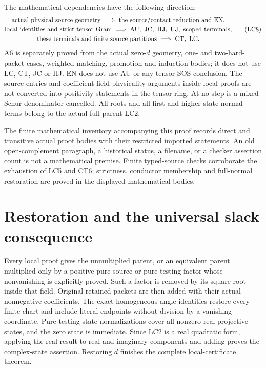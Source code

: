 The mathematical dependencies have the following direction:
\[
\begin{gathered}
 \text{actual physical source geometry}
       \ \Longrightarrow\ \text{the source/contact reduction and EN},\\
 \text{local identities and strict tensor Gram}
       \ \Longrightarrow\ {\rm AU,\ JC,\ HJ,\ UJ},
       \ \text{scoped terminals},\\
 \text{these terminals and finite source partitions}
       \ \Longrightarrow\ {\rm CT,\ LC}.
\end{gathered}\tag{LC8}
\]
A6 is separately proved from the actual zero-\(d\) geometry,
one- and two-hard-packet cases, weighted matching, promotion
and induction bodies; it does not use LC, CT, JC or HJ.
EN does not use AU or any tensor-SOS conclusion.
The source entries and coefficient-field physicality arguments
inside local proofs are not converted into positivity
statements in the tensor ring.
At no step is a mixed Schur denominator cancelled.
All roots and all first and higher state-normal terms belong
to the actual full parent LC2.

The finite mathematical inventory accompanying this proof
records direct and transitive actual proof bodies with their
restricted imported statements.  An old open-complement
paragraph, a historical status, a filename, or a checker
assertion count is not a mathematical premise.
Finite typed-source checks corroborate the exhaustion of
LC5 and CT6; strictness, conductor membership and full-normal
restoration are proved in the displayed mathematical bodies.

\section{Restoration and the universal slack consequence}

Every local proof gives the unmultiplied parent, or an
equivalent parent multiplied only by a positive pure-source
or pure-testing factor whose nonvanishing is explicitly
proved.  Such a factor is removed by its square root inside
that field.  Original retained packets are then added with
their actual nonnegative coefficients.
The exact homogeneous angle identities restore every finite
chart and include literal endpoints without division by
a vanishing coordinate.  Pure-testing state normalizations
cover all nonzero real projective states, and the zero state
is immediate.  Since LC2 is a real quadratic form, applying
the real result to real and imaginary components and adding
proves the complex-state assertion.  Restoring \(d\)
finishes the complete local-certificate theorem.

